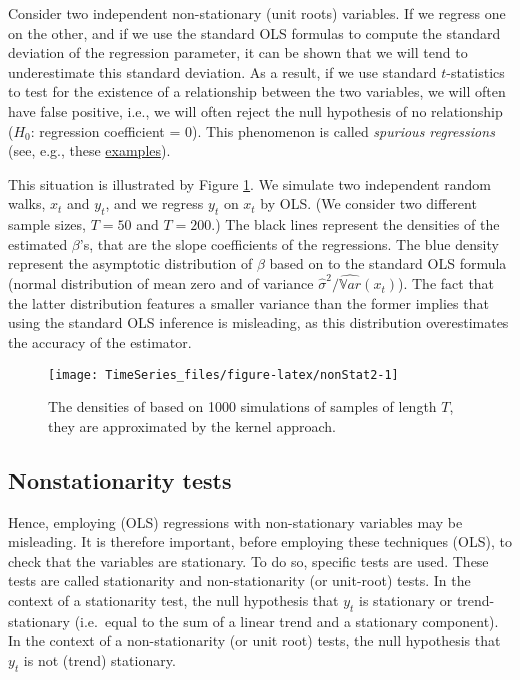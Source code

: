 \documentclass[
  12pt,
]{book}
\theoremstyle{definition}
\theoremstyle{definition}
\theoremstyle{definition}
\theoremstyle{definition}
\theoremstyle{remark}
\begin{document}
Consider two independent non-stationary (unit roots) variables. If we regress one on the other, and if we use the standard OLS formulas to compute the standard deviation of the regression parameter, it can be shown that we will tend to underestimate this standard deviation. As a result, if we use standard \(t\)-statistics to test for the existence of a relationship between the two variables, we will often have false positive, i.e., we will often reject the null hypothesis of no relationship (\(H_0\): regression coefficient = 0). This phenomenon is called \emph{spurious regressions} (see, e.g., these \href{/href\%7Bhttp://www.eco.uc3m.es/~jgonzalo/teaching/timeseriesMA/examplesspuriousregression.pdf}{examples}).

This situation is illustrated by Figure \ref{fig:nonStat2}. We simulate two independent random walks, \(x_t\) and \(y_t\), and we regress \(y_t\) on \(x_t\) by OLS. (We consider two different sample sizes, \(T=50\) and \(T=200\).) The black lines represent the densities of the estimated \(\beta\)'s, that are the slope coefficients of the regressions. The blue density represent the asymptotic distribution of \(\beta\) based on to the standard OLS formula (normal distribution of mean zero and of variance \(\hat\sigma^2/\widehat{\mathbb{V}ar}(x_t)\)). The fact that the latter distribution features a smaller variance than the former implies that using the standard OLS inference is misleading, as this distribution overestimates the accuracy of the estimator.

\begin{figure}
\texttt{[image: TimeSeries\_files/figure-latex/nonStat2-1]} \caption{The densities of based on 1000 simulations of samples of length $T$, they are approximated by the kernel approach.}\label{fig:nonStat2}
\end{figure}

\hypertarget{nonstationarity-tests}{%
\subsection{Nonstationarity tests}\label{nonstationarity-tests}}

Hence, employing (OLS) regressions with non-stationary variables may be misleading. It is therefore important, before employing these techniques (OLS), to check that the variables are stationary. To do so, specific tests are used. These tests are called stationarity and non-stationarity (or unit-root) tests. In the context of a stationarity test, the null hypothesis that \(y_t\) is stationary or trend-stationary (i.e.~equal to the sum of a linear trend and a stationary component). In the context of a non-stationarity (or unit root) tests, the null hypothesis that \(y_t\) is not (trend) stationary.
\end{document}

